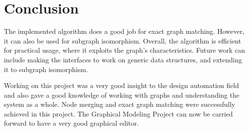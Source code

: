 \chapter{Conclusion}\label{chapter:conclusion}
The implemented algorithm does a good job for exact graph matching. However, it can also be used for subgraph isomorphism. Overall, the algorithm is efficient for practical usage, where it exploits the graph's characteristics. Future work can include making the interfaces to work on generic data structures, and extending it to subgraph isomorphism.  

Working on this project was a very good insight to the design automation field and also gave a good knowledge of working with graphs and understanding the system as a whole. Node merging and exact graph matching were successfully achieved in this project. The Graphical Modeling Project can now be carried forward to have a very good graphical editor. 